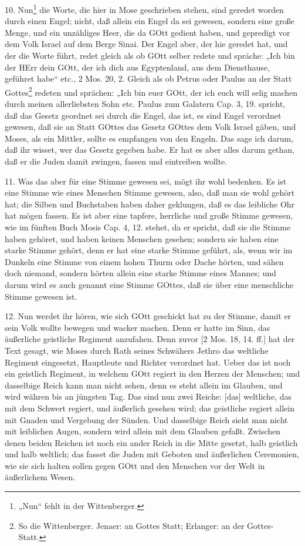 10. Nun\footnote{„Nun“ fehlt in der Wittenberger.} die Worte, die hier in Mose geschrieben stehen, sind geredet worden durch einen Engel; nicht, daß allein ein Engel da sei gewesen, sondern eine große Menge, und ein unzähliges Heer, die da GOtt gedient haben, und gepredigt vor dem Volk Israel auf dem Berge Sinai. Der Engel aber, der hie geredet hat, und der die Worte führt, redet gleich als ob GOtt selber redete und spräche: „Ich bin der HErr dein GOtt, der ich dich aus Egyptenland, aus dem Diensthause, geführet habe“ etc., 2 Mos. 20, 2. Gleich als ob Petrus oder Paulus an der Statt Gottes\footnote{So die Wittenberger. Jenaer: an Gottes Statt; Erlanger: an der Gottes-Statt.} redeten und sprächen: „Ich bin euer GOtt, der ich euch will selig machen durch meinen allerliebsten Sohn etc. Paulus zum Galatern Cap. 3, 19. spricht, daß das Gesetz geordnet sei durch die Engel, das ist, es sind Engel verordnet gewesen, daß sie an Statt GOttes das Gesetz GOttes dem Volk Israel gäben, und Moses, als ein Mittler, sollte es empfangen von den Engeln. Das sage ich darum, daß ihr wisset, wer das Gesetz gegeben habe. Er hat es aber alles darum gethan, daß er die Juden damit zwingen, fassen und eintreiben wollte.

11. Was das aber für eine Stimme gewesen sei, mögt ihr wohl bedenken. Es ist eine Stimme wie eines Menschen Stimme gewesen, also, daß man sie wohl gehört hat; die Silben und Buchstaben haben daher geklungen, daß es das leibliche Ohr hat mögen fassen. Es ist aber eine tapfere, herrliche und große Stimme gewesen, wie im fünften Buch Mosis Cap. 4, 12. stehet, da er spricht, daß sie die Stimme haben gehöret, und haben keinen Menschen gesehen; sondern sie haben eine starke Stimme gehört, denn er hat eine starke Stimme geführt, als, wenn wir im Dunkeln eine Stimme von einem hohen Thurm oder Dache hörten, und sähen doch niemand, sondern hörten allein eine starke Stimme eines Mannes; und darum wird es auch genannt eine Stimme GOttes, daß sie über eine menschliche Stimme gewesen ist.

12. Nun werdet ihr hören, wie sich GOtt geschickt hat zu der Stimme, damit er sein Volk wollte bewegen und wacker machen. Denn er hatte im Sinn, das äußerliche geistliche Regiment anzufahen. Denn zuvor [2 Mos. 18, 14. ff.] hat der Text gesagt, wie Moses durch Rath seines Schwähers Jethro das weltliche Regiment eingesetzt, Hauptleute und Richter verordnet hat. Ueber das ist noch ein geistlich Regiment, in welchem GOtt regiert in den Herzen der Menschen; und dasselbige Reich kann man nicht sehen, denn es steht allein im Glauben, und wird währen bis an jüngsten Tag. Das sind nun zwei Reiche: [das] weltliche, das mit dem Schwert regiert, und äußerlich gesehen wird; das geistliche regiert allein mit Gnaden und Vergebung der Sünden. Und dasselbige Reich sieht man nicht mit leiblichen Augen, sondern wird allein mit dem Glauben gefaßt. Zwischen denen beiden Reichen ist noch ein ander Reich in die Mitte gesetzt, halb geistlich und halb weltlich; das fasset die Juden mit Geboten und äußerlichen Ceremonien, wie sie sich halten sollen gegen GOtt und den Menschen vor der Welt in äußerlichem Wesen.

